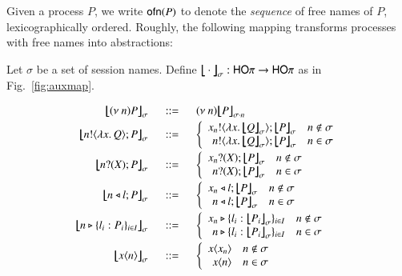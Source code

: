 Given a process $P$, we write $\mathsf{ofn}(P)$ to denote the
\emph{sequence} of free names of $P$, lexicographically ordered.
Roughly, the following mapping transforms processes
with free names into abstractions:
%
\begin{definition}%
	\label{def:auxmap}
	Let $\sigma$ be a set of session names.
	Define $\big\lfloor\!\!\big\lfloor\cdot\big\rfloor\!\!\big\rfloor_{\sigma}: \mathsf{HO}\pi \to \mathsf{HO}\pi$  as in Fig.~\ref{fig:auxmap}.
%
\begin{figure}[t]
\[
	\begin{array}{rcl}
		\auxmap{\news{n} P}{\sigma} &\bnfis& \news{n} \auxmap{P}{{\sigma \cat n}}
		\vspace{1mm} \\

		\auxmap{\bout{n}{\abs{x}{Q}} P}{\sigma} &\bnfis&
		\left\{
		\begin{array}{rl}
			\bout{x_n}{\abs{x}{\auxmap{Q}{\sigma}}} \auxmap{P}{\sigma} & n \notin \sigma\\
			\bout{n}{\abs{x}{\auxmap{Q}{\sigma}}} \auxmap{P}{\sigma} & n \in \sigma
		\end{array}
		\right.
		\vspace{1mm}	\\ 

		\auxmap{\binp{n}{X} P}{\sigma} &\bnfis&
		\left\{
		\begin{array}{rl}
			\binp{x_n}{X} \auxmap{P}{\sigma} & n \notin \sigma\\
			\binp{n}{X} \auxmap{P}{\sigma} & n \in \sigma
		\end{array}
		\right.

		\vspace{1mm}	\\ 
		\auxmap{\bsel{n}{l} P}{\sigma} &\bnfis&
		\left\{
		\begin{array}{rl}
			\bsel{x_n}{l} \auxmap{P}{\sigma} & n \notin \sigma\\
			\bsel{n}{l} \auxmap{P}{\sigma} & n \in \sigma
		\end{array}
		\right.
		\vspace{1mm} \\
		\auxmap{\bbra{n}{l_i:P_i}_{i \in I}}{\sigma} &\bnfis&

		\left\{
		\begin{array}{rl}
			\bbra{x_n}{l_i:\auxmap{P_i}{\sigma}}_{i \in I}  & n \notin \sigma\\
			\bbra{n}{l_i:\auxmap{P_i}{\sigma}}_{i \in I}  & n \in \sigma
		\end{array}
		\right.
		\vspace{1mm} \\
		\auxmap{\appl{x}{n}}{\sigma} &\bnfis&
		\left\{
		\begin{array}{rl}
			\appl{x}{x_n} & n \notin \sigma\\
			\appl{x}{n} & n \in \sigma\\
		\end{array}
		\right.
		\vspace{1mm} \\


\end{array}\]
\end{figure}
\end{definition}
